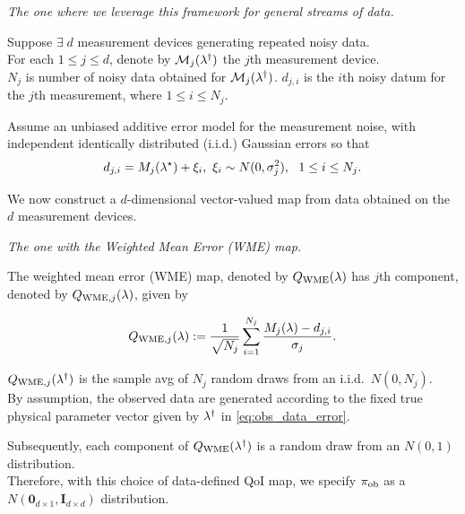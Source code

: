 \begin{frame}[t]{\it The one where we leverage this framework for general streams of data.}

Suppose $\exists \; d$ measurement devices generating repeated noisy data. \\
\vskip 12pt
For each $1\leq j\leq d$, denote by $\mathcal{M}_j(\lambda^\dagger)$ the $j$th measurement device. \\

$N_j$ is number of noisy data obtained for $\mathcal{M}_j(\lambda^\dagger)$.
\vskip 12pt
$d_{j,i}$ is the $i$th noisy datum for the $j$th measurement, where $1\leq i\leq N_j$.

\vskip 12pt
Assume an unbiased additive error model for the measurement noise,
with independent identically distributed (i.i.d.) Gaussian errors so that
\begin{equation}\label{eq:obs_data_error}
	d_{j,i} = M_j(\param^\star) + \xi_i, \ \xi_i\sim N(0,\sigma_j^2), \ \ 1\leq i\leq N_j.
\end{equation}

\vskip 12pt
We now construct a $d$-dimensional vector-valued map from data obtained on the $d$ measurement devices.

\end{frame}


\begin{frame}[t]{\it The one with the Weighted Mean Error (WME) map.}


The weighted mean error (WME) map, denoted by $Q_\text{WME}(\lambda)$ has $j$th component, denoted by $Q_{\text{WME},j}(\lambda)$, given by

\begin{equation}\label{eq:qoi_WME}
	Q_{\text{WME},j}(\lambda) := \frac{1}{\sqrt{N_j}} \sum_{i=1}^{N_j} \frac{M_j(\lambda)-d_{j,i}}{\sigma_j}.
\end{equation}

\vskip 12pt
$Q_{\text{WME},j}(\lambda^\dagger)$ is the sample avg of $N_j$ random draws from an i.i.d.~$N(0,N_j)$.\\
By assumption, the observed data are generated according to the fixed true physical parameter vector given by $\lambda^\dagger$ in \eqref{eq:obs_data_error}.

\vskip 12pt
Subsequently, each component of $Q_\text{WME}(\lambda^\dagger)$ is a random draw from an $N(0,1)$ distribution.\\
Therefore, with this choice of data-defined QoI map, we specify $\operatorname*{\pi_{ob}}$ as a $N(\mathbf{0}_{d\times 1},\mathbf{I}_{d\times d})$ distribution.

\end{frame}


